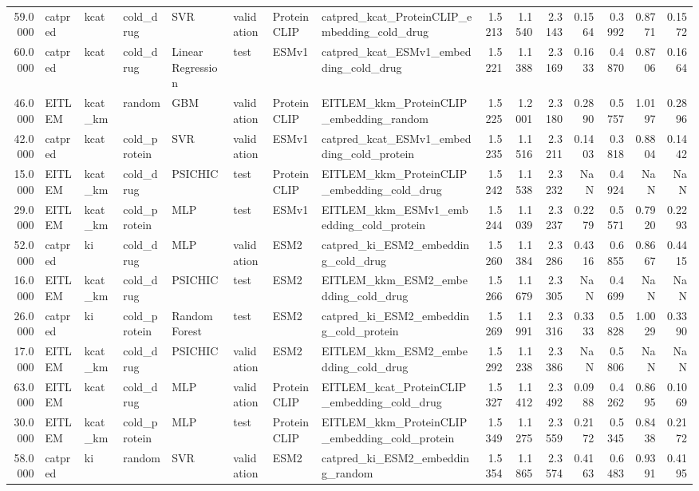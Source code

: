 \begin{tabular}{rlllllllrrrrrrr}
59.0000 & catpred & kcat & cold_drug & SVR & validation & ProteinCLIP & catpred_kcat_ProteinCLIP_embedding_cold_drug & 1.5213 & 1.1540 & 2.3143 & 0.1564 & 0.3992 & 0.8771 & 0.1572 \\
60.0000 & catpred & kcat & cold_drug & Linear Regression & test & ESMv1 & catpred_kcat_ESMv1_embedding_cold_drug & 1.5221 & 1.1388 & 2.3169 & 0.1633 & 0.4870 & 0.8706 & 0.1664 \\
46.0000 & EITLEM & kcat_km & random & GBM & validation & ProteinCLIP & EITLEM_kkm_ProteinCLIP_embedding_random & 1.5225 & 1.2001 & 2.3180 & 0.2890 & 0.5757 & 1.0197 & 0.2896 \\
42.0000 & catpred & kcat & cold_protein & SVR & validation & ESMv1 & catpred_kcat_ESMv1_embedding_cold_protein & 1.5235 & 1.1516 & 2.3211 & 0.1403 & 0.3818 & 0.8804 & 0.1442 \\
15.0000 & EITLEM & kcat_km & cold_drug & PSICHIC & test & ProteinCLIP & EITLEM_kkm_ProteinCLIP_embedding_cold_drug & 1.5242 & 1.1538 & 2.3232 & NaN & 0.4924 & NaN & NaN \\
29.0000 & EITLEM & kcat_km & cold_protein & MLP & test & ESMv1 & EITLEM_kkm_ESMv1_embedding_cold_protein & 1.5244 & 1.1039 & 2.3237 & 0.2279 & 0.5571 & 0.7920 & 0.2293 \\
52.0000 & catpred & ki & cold_drug & MLP & validation & ESM2 & catpred_ki_ESM2_embedding_cold_drug & 1.5260 & 1.1384 & 2.3286 & 0.4316 & 0.6855 & 0.8667 & 0.4415 \\
16.0000 & EITLEM & kcat_km & cold_drug & PSICHIC & test & ESM2 & EITLEM_kkm_ESM2_embedding_cold_drug & 1.5266 & 1.1679 & 2.3305 & NaN & 0.4699 & NaN & NaN \\
26.0000 & catpred & ki & cold_protein & Random Forest & test & ESM2 & catpred_ki_ESM2_embedding_cold_protein & 1.5269 & 1.1991 & 2.3316 & 0.3333 & 0.5828 & 1.0029 & 0.3390 \\
17.0000 & EITLEM & kcat_km & cold_drug & PSICHIC & validation & ESM2 & EITLEM_kkm_ESM2_embedding_cold_drug & 1.5292 & 1.1238 & 2.3386 & NaN & 0.5806 & NaN & NaN \\
63.0000 & EITLEM & kcat & cold_drug & MLP & validation & ProteinCLIP & EITLEM_kcat_ProteinCLIP_embedding_cold_drug & 1.5327 & 1.1412 & 2.3492 & 0.0988 & 0.4262 & 0.8695 & 0.1069 \\
30.0000 & EITLEM & kcat_km & cold_protein & MLP & test & ProteinCLIP & EITLEM_kkm_ProteinCLIP_embedding_cold_protein & 1.5349 & 1.1275 & 2.3559 & 0.2172 & 0.5345 & 0.8438 & 0.2172 \\
58.0000 & catpred & ki & random & SVR & validation & ESM2 & catpred_ki_ESM2_embedding_random & 1.5354 & 1.1865 & 2.3574 & 0.4163 & 0.6483 & 0.9391 & 0.4195 \\

\end{tabular}
